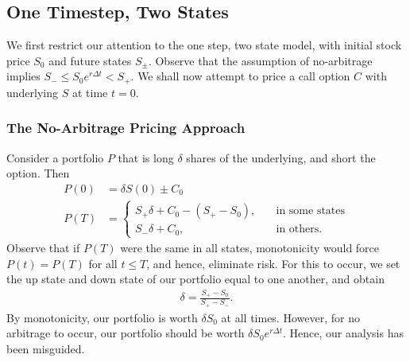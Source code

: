 \documentclass[12pt]{article}
\theoremstyle{plain}
\theoremstyle{definition}
\theoremstyle{remark}
\numberwithin{equation}{section}  %
\begin{document}
\subsection{One Timestep, Two States}
We first restrict our attention to the one step, two state model, with
initial stock price $S_{0}$ and future states $S_{\pm}$. Observe that
the assumption of no-arbitrage implies $S_{-} \le S_{0}e^{r \Delta t} < S_{+}$.
We shall now attempt to price a call option $C$ with underlying $S$ at time
$t=0$. 

\subsubsection{The No-Arbitrage Pricing Approach}
Consider a portfolio $P$ that is long $\delta$
shares of the underlying, and short the option. Then
\begin{equation*}
	\begin{split}
		P(0)  & = \delta S(0) \pm C_{0} 
		\\
		P(T)  & = \begin{cases}
			S_{+} \delta + C_{0} - (S_{+} - S_{0}), \quad & \text{in some states}
			\\
			S_{-} \delta + C_{0}, \quad & \text{in others}.
		\end{cases}
	\end{split}
\end{equation*}
Observe that if $P(T)$ were the same in all states, monotonicity would force
$P(t) = P(T)$ for all $t \le T$, and hence, eliminate risk. For this to occur,
we set the up state and down state of our portfolio equal to one another, and
obtain 
\begin{equation}\label{risk-free-delta}
	\begin{split}
		\delta = \frac{S_{+} - S_{0}}{S_{+} - S_{-}}.	
	\end{split}
\end{equation}
By monotonicity, our portfolio is worth $\delta S_{0}$ at all times. 
However, for no arbitrage to occur, our portfolio should be worth
$\delta S_{0} e^{r \Delta t}$. Hence, our analysis has been misguided.
\end{document}
